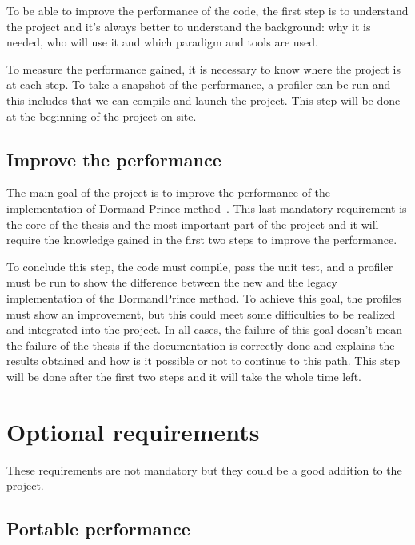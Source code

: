 To be able to improve the performance of the code, the first step is to understand the project and it's always better to understand the background: why it is needed, who will use it and which paradigm and tools are used.

To measure the performance gained, it is necessary to know where the project is at each step.
To take a snapshot of the performance, a profiler can be run and this includes that we can compile and launch the project.
This step will be done at the beginning of the project on-site.


\subsection{Improve the performance}
\label{spec:ch:goals:mandatory-requirements:improve-the-performance}

The main goal of the project is to improve the performance of the implementation of Dormand-Prince method~\cite{princeDormand}.
This last mandatory requirement is the core of the thesis and the most important part of the project and it will require the knowledge gained in the first two steps to improve the performance.

To conclude this step, the code must compile, pass the unit test, and a profiler must be run to show the difference between the new and the legacy implementation of the DormandPrince method.
To achieve this goal, the profiles must show an improvement, but this could meet some difficulties to be realized and integrated into the project.
In all cases, the failure of this goal doesn't mean the failure of the thesis if the documentation is correctly done and explains the results obtained and how is it possible or not to continue to this path.
This step will be done after the first two steps and it will take the whole time left.


\section{Optional requirements}
\label{spec:ch:goals:optional-requirements}

These requirements are not mandatory but they could be a good addition to the project.

\subsection{Portable performance}
\label{spec:ch:goals:optional-requirements:general-optimization}

